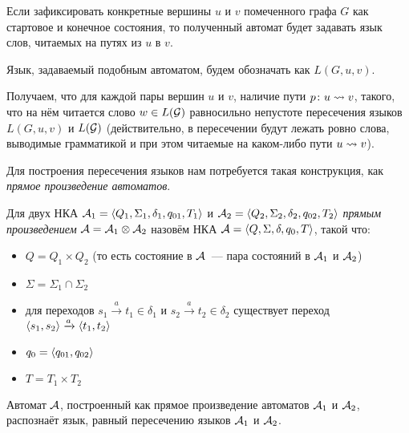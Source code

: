 \begin{proposition}
  Если зафиксировать конкретные вершины $u$ и $v$ помеченного графа $G$ как стартовое и конечное состояния, то полученный автомат будет задавать язык слов, читаемых на путях из $u$ в $v$.

\end{proposition}

Язык, задаваемый подобным автоматом, будем обозначать как $L(G, u, v)$.

Получаем, что для каждой пары вершин $u$ и $v$, наличие пути $p \colon u \rightsquigarrow v$, такого, что на нём читается слово $w \in L(\mathcal{G})$ равносильно непустоте пересечения языков $L(G, u, v)$ и $L(\mathcal{G})$ (действительно, в пересечении будут лежать ровно слова, выводимые грамматикой и при этом читаемые на каком-либо пути $u \rightsquigarrow v$).

Для построения пересечения языков нам потребуется такая конструкция, как \textit{прямое произведение автоматов}.

\begin{definition}

  Для двух НКА $\mathcal{A}_1 = \langle Q_1, \Sigma_1, \delta_1, q_{01}, T_1 \rangle$ и $\mathcal{A}_2 = \langle Q_2, \Sigma_2, \delta_2, q_{02}, T_2 \rangle$ \textit{прямым произведением} $\mathcal{A} = \mathcal{A}_1 \otimes \mathcal{A}_2$ назовём НКА $\mathcal{A} = \langle Q, \Sigma, \delta, q_0, T \rangle$, такой что:
  \vspace{-\topsep}
  \begin{itemize}
    \setlength\itemsep{-0.1em}
    \item $Q = Q_1 \times Q_2$ (то есть состояние в $\mathcal{A}$~--- пара состояний в $\mathcal{A}_1$ и $\mathcal{A}_2$)
    \item $\Sigma = \Sigma_1 \cap \Sigma_2$
    \item для переходов $s_1 \xrightarrow{a} t_1 \in \delta_1$ и $s_2 \xrightarrow{a} t_2 \in \delta_2$ существует переход $\langle s_1, s_2 \rangle \xrightarrow{a} \langle t_1, t_2 \rangle$ 
    \item $q_0 = \langle q_{01}, q_{02} \rangle$
    \item $T = T_1 \times T_2$
  \end{itemize}

\end{definition}

\begin{proposition}\label{prop:reg_inter} \cite{Hopcroft1979}
  Автомат $\mathcal{A}$, построенный как прямое произведение автоматов $\mathcal{A}_1$ и $\mathcal{A}_2$, распознаёт язык, равный пересечению языков $\mathcal{A}_1$ и $\mathcal{A}_2$.
\end{proposition}

